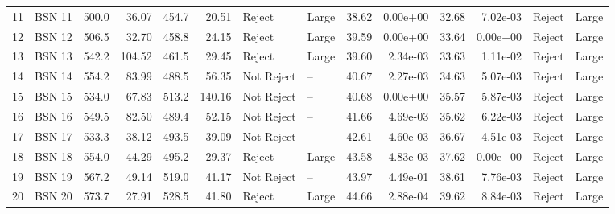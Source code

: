 \begin{tabular}{llrrrrllrrrrll}
11 &  BSN 11 &              500.0 &   36.07 &               454.7 &   20.51 &      Reject &       Large &                    38.62 &  0.00e+00 &                     32.68 &  7.02e-03 &  Reject &       Large \\
12 &  BSN 12 &              506.5 &   32.70 &               458.8 &   24.15 &      Reject &       Large &                    39.59 &  0.00e+00 &                     33.64 &  0.00e+00 &  Reject &       Large \\
13 &  BSN 13 &              542.2 &  104.52 &               461.5 &   29.45 &      Reject &       Large &                    39.60 &  2.34e-03 &                     33.63 &  1.11e-02 &  Reject &       Large \\
14 &  BSN 14 &              554.2 &   83.99 &               488.5 &   56.35 &  Not Reject &          -- &                    40.67 &  2.27e-03 &                     34.63 &  5.07e-03 &  Reject &       Large \\
15 &  BSN 15 &              534.0 &   67.83 &               513.2 &  140.16 &  Not Reject &          -- &                    40.68 &  0.00e+00 &                     35.57 &  5.87e-03 &  Reject &       Large \\
16 &  BSN 16 &              549.5 &   82.50 &               489.4 &   52.15 &  Not Reject &          -- &                    41.66 &  4.69e-03 &                     35.62 &  6.22e-03 &  Reject &       Large \\
17 &  BSN 17 &              533.3 &   38.12 &               493.5 &   39.09 &  Not Reject &          -- &                    42.61 &  4.60e-03 &                     36.67 &  4.51e-03 &  Reject &       Large \\
18 &  BSN 18 &              554.0 &   44.29 &               495.2 &   29.37 &      Reject &       Large &                    43.58 &  4.83e-03 &                     37.62 &  0.00e+00 &  Reject &       Large \\
19 &  BSN 19 &              567.2 &   49.14 &               519.0 &   41.17 &  Not Reject &          -- &                    43.97 &  4.49e-01 &                     38.61 &  7.76e-03 &  Reject &       Large \\
20 &  BSN 20 &              573.7 &   27.91 &               528.5 &   41.80 &      Reject &       Large &                    44.66 &  2.88e-04 &                     39.62 &  8.84e-03 &  Reject &       Large \\
\bottomrule
\end{tabular}
